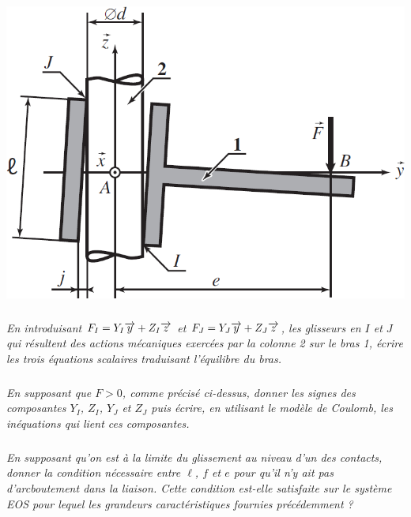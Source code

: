\documentclass[10pt,fleqn]{article} %
\begin{document}
\begin{multicols}{2}
\begin{center}
\includegraphics[width=\linewidth]{images/fig_01}
\end{center}


\subparagraph{}\textit{En introduisant $F_I = Y_ I \overrightarrow{y} + Z_ I \overrightarrow{z}$ et $F_J = Y_ J \overrightarrow{y} + Z_ J \overrightarrow{z}$, les glisseurs en $I$ et $J$ qui résultent des actions mécaniques exercées par la colonne 2 sur le bras 1, écrire les trois équations scalaires traduisant l’équilibre du bras.}
\ifprof
\begin{corrige}
\end{corrige}
\else
\fi


\subparagraph{}\textit{En supposant que $F > 0$, comme précisé ci-dessus, donner  les signes des composantes  $Y_I$, $Z_I$, $Y_J$ et $Z_J$ puis écrire,  en utilisant  le modèle  de Coulomb, les inéquations  qui lient ces composantes.}
\ifprof
\begin{corrige}
\end{corrige}
\else
\fi



\subparagraph{}\textit{En supposant qu’on est à  la limite du glissement au niveau d’un des contacts, donner la condition nécessaire entre $\ell$, $f$ et $e$ pour qu’il n’y ait pas d’arcboutement dans la liaison. Cette condition est-elle satisfaite sur le système EOS pour lequel les grandeurs caractéristiques fournies précédemment ?}
\ifprof
\begin{corrige}
\end{corrige}
\else
\fi






\end{multicols}
 
\end{document}
